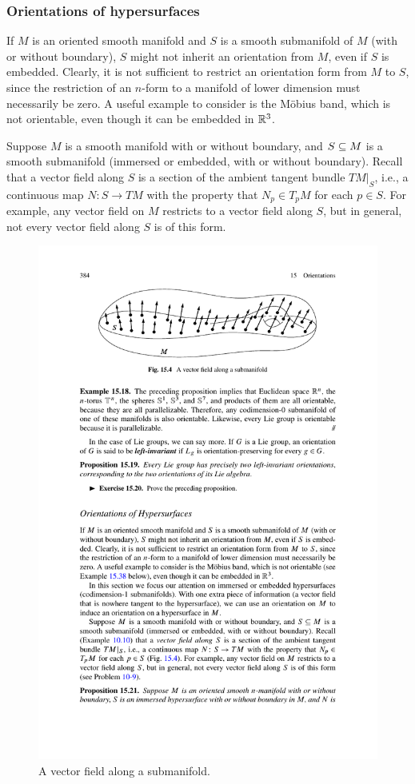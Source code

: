 \subsubsection{Orientations of hypersurfaces}
If $M$ is an oriented smooth manifold and $S$ is a smooth submanifold of $M$ (with or without boundary), $S$ might not inherit an orientation from $M$, even if $S$ is embedded. Clearly, it is not sufficient to restrict an orientation form from $M$ to $S$, since the restriction of an $n$-form to a manifold of lower dimension must necessarily be zero. A useful example to consider is the M\"obius band, which is not orientable, even though it can be embedded in $\mathbb{R}^3$.\par
Suppose $M$ is a smooth manifold with or without boundary, and $S\subseteq M$ is a smooth submanifold (immersed or embedded, with or without boundary). Recall that a vector field along $S$ is a section of the ambient tangent bundle $TM|_S$, i.e., a continuous map $N:S\to TM$ with the property that $N_p\in T_pM$ for each $p\in S$. For example, any vector field on $M$ restricts to a vector field along $S$, but in general, not every vector field along $S$ is of this form.
\begin{figure}[htbp]
\centering
\includegraphics{pictures/vector-field-along}
\caption{A vector field along a submanifold.}
\end{figure}
